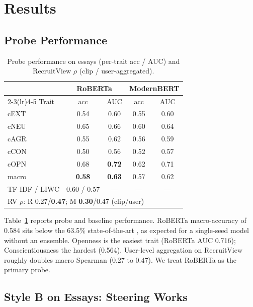\documentclass[10pt, a4paper]{article}
\begin{document}
\section{Results}

\subsection{Probe Performance}

\begin{table}[t]
\caption{Probe performance on essays (per-trait acc / AUC) and RecruitView $\rho$ (clip / user-aggregated).}
\label{tab:probes}
\begin{center}
\small
\begin{tabular}{lcccc}
\toprule
& \multicolumn{2}{c}{RoBERTa} & \multicolumn{2}{c}{ModernBERT} \\
\cmidrule(lr){2-3}\cmidrule(lr){4-5}
Trait & acc & AUC & acc & AUC \\
\midrule
cEXT & 0.54 & 0.60 & 0.55 & 0.60 \\
cNEU & 0.65 & 0.66 & 0.60 & 0.64 \\
cAGR & 0.55 & 0.62 & 0.56 & 0.59 \\
cCON & 0.50 & 0.56 & 0.52 & 0.57 \\
cOPN & 0.68 & \textbf{0.72} & 0.62 & 0.71 \\
\midrule
macro      & \textbf{0.58} & \textbf{0.63} & 0.57 & 0.62 \\
TF-IDF / LIWC & 0.60 / 0.57 & --- & --- & --- \\
\midrule
\multicolumn{5}{l}{\small RV $\rho$: R 0.27/\textbf{0.47}; M \textbf{0.30}/0.47 (clip/user)} \\
\bottomrule
\end{tabular}
\end{center}
\end{table}

Table~\ref{tab:probes} reports probe and baseline performance. RoBERTa macro-accuracy of 0.584 sits below the 63.5\% state-of-the-art \citep{kerz-etal-2022-pushing}, as expected for a single-seed model without an ensemble. Openness is the easiest trait (RoBERTa AUC 0.716); Conscientiousness the hardest (0.564). User-level aggregation on RecruitView roughly doubles macro Spearman (0.27 to 0.47). We treat RoBERTa as the primary probe.

\subsection{Style B on Essays: Steering Works}
\end{document}
